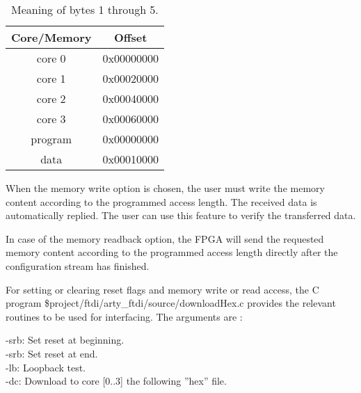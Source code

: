 \begin{table}[h]
	{
		\begin{small}
			\begin{center}
				\begin{tabular}{c c}
					\hline
					\multicolumn{1}{|c|}{Core/Memory} &
					\multicolumn{1}{|c|}{Offset} \\
					\hline
					\multicolumn{1}{|c|}{core 0} &
					\multicolumn{1}{|c|}{0x00000000} \\
					\hline
					\multicolumn{1}{|c|}{core 1} &
					\multicolumn{1}{|c|}{0x00020000} \\
					\hline
					\multicolumn{1}{|c|}{core 2} &
					\multicolumn{1}{|c|}{0x00040000} \\
					\hline
					\multicolumn{1}{|c|}{core 3} &
					\multicolumn{1}{|c|}{0x00060000} \\
					\hline
					\multicolumn{1}{|c|}{program} &
					\multicolumn{1}{|c|}{0x00000000} \\
					\hline
					\multicolumn{1}{|c|}{data} &
					\multicolumn{1}{|c|}{0x00010000} \\
					\hline
				\end{tabular}
			\end{center}
		\end{small}
	}
	\caption{Meaning of bytes 1 through 5.}
	\label{uart_byte_1_5}
\end{table}

When the memory write option is chosen, the user must write the memory content according to the programmed access length. The received data is automatically replied. The user can use this feature to verify the transferred data.


In case of the memory readback option, the FPGA will send the requested memory content according to the programmed access length directly after the configuration stream has finished.

For setting or clearing reset flags and memory write or read access, the C program \$project/ftdi/arty\_ftdi/source/downloadHex.c provides the relevant routines to be used for interfacing. The arguments are :

\indent -srb: Set reset at beginning.\\ 
\indent -srb: Set reset at end.\\ 
\indent -lb: Loopback test.\\
\indent -dc: Download to core [0..3] the following ''hex'' file.

